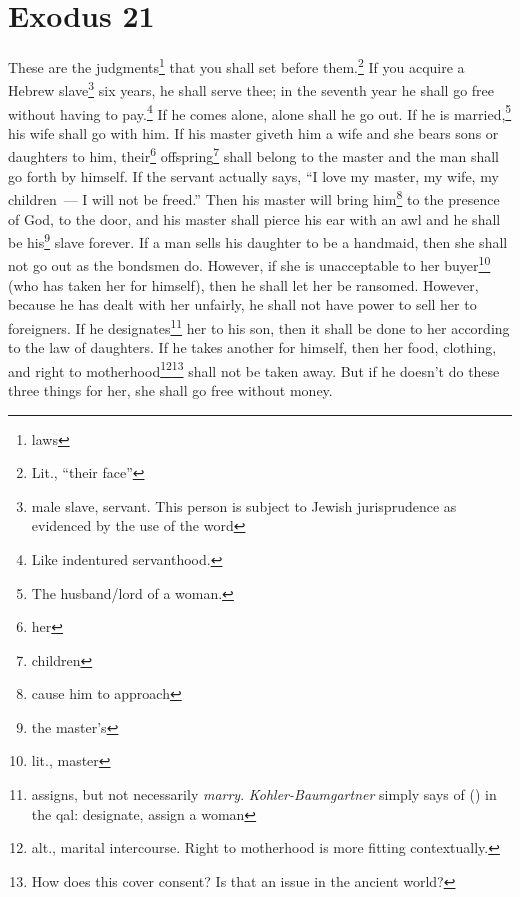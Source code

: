 \section{Exodus 21}\label{Exodus 21}
\begin{enumerate}[align=center]
     These are the judgments\footnote{laws} that you shall set before them.\footnote{Lit., ``their face''}%
     If you acquire a Hebrew slave\footnote{male slave, servant. This person is subject to Jewish jurisprudence as evidenced by the use of the word } six years, he shall serve thee; in the seventh year he shall go free without having to pay.\footnote{Like indentured servanthood.}%
     If he comes alone, alone shall he go out. If he is married,\footnote{The husband/lord of a woman.} his wife shall go with him.%
     If his master giveth him a wife and she bears sons or daughters to him, their\footnote{her} offspring\footnote{children} shall belong to the master and the man shall go forth by himself.%
     If the servant actually says, ``I love my master, my wife, my children~--- I will not be freed.''%
     Then his master will bring him\footnote{cause him to approach} to the presence of God, to the door, and his master shall pierce his ear with an awl and he shall be his\footnote{the master's} slave forever.%
     If a man sells his daughter to be a handmaid, then she shall not go out as the bondsmen do.%
     However, if she is unacceptable to her buyer\footnote{lit., master} (who has taken her for himself), then he shall let her be ransomed. However, because he has dealt with her unfairly, he shall not have power to sell her to foreigners.%
     If he designates\footnote{assigns, but not necessarily \textit{marry}. \textit{Kohler-Baumgartner} simply says of  () in the qal: designate, assign a woman} her to his son, then it shall be done to her according to the law of daughters.%
     If he takes another for himself, then her food, clothing, and right to motherhood\footnote{alt., marital intercourse. Right to motherhood is more fitting contextually.}\footnote{How does this cover consent? Is that an issue in the ancient world?} shall not be taken away.%
     But if he doesn't do these three things for her, she shall go free without money.%

\end{enumerate}
